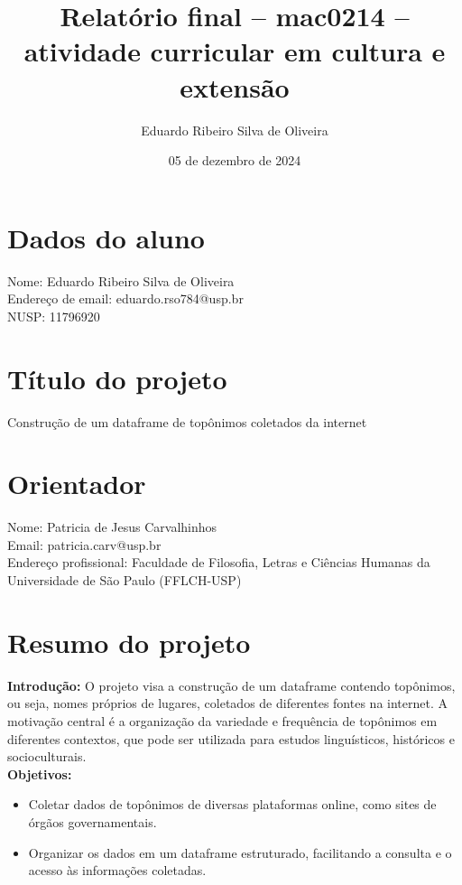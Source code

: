 \documentclass{article}
\title{Relatório final – mac0214 – atividade curricular em cultura e extensão}
\author{Eduardo Ribeiro Silva de Oliveira}
\date{05 de dezembro de 2024}
\begin{document}
\maketitle

\section*{Dados do aluno}
Nome: Eduardo Ribeiro Silva de Oliveira\\
Endereço de email: eduardo.rso784@usp.br\\
NUSP: 11796920

\section*{Título do projeto}
Construção de um dataframe de topônimos coletados da internet

\section*{Orientador}
Nome: Patricia de Jesus Carvalhinhos\\
Email: patricia.carv@usp.br\\
Endereço profissional: Faculdade de Filosofia, Letras e Ciências Humanas da Universidade de São Paulo (FFLCH-USP)

\section*{Resumo do projeto}
\textbf{Introdução:} O projeto visa a construção de um dataframe contendo topônimos, ou seja, nomes próprios de lugares, coletados de diferentes fontes na internet. A motivação central é a organização da variedade e frequência de topônimos em diferentes contextos, que pode ser utilizada para estudos linguísticos, históricos e socioculturais.\\
\textbf{Objetivos:}
\begin{itemize}
    \item Coletar dados de topônimos de diversas plataformas online, como sites de órgãos governamentais.
    \item Organizar os dados em um dataframe estruturado, facilitando a consulta e o acesso às informações coletadas.
\end{itemize}
\end{document}
